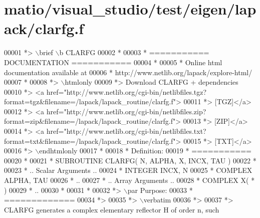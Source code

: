 \hypertarget{matio_2visual__studio_2test_2eigen_2lapack_2clarfg_8f_source}{}\section{matio/visual\+\_\+studio/test/eigen/lapack/clarfg.f}
\label{matio_2visual__studio_2test_2eigen_2lapack_2clarfg_8f_source}

\begin{DoxyCode}
00001 \textcolor{comment}{*> \(\backslash\)brief \(\backslash\)b CLARFG}
00002 \textcolor{comment}{*}
00003 \textcolor{comment}{*  =========== DOCUMENTATION ===========}
00004 \textcolor{comment}{*}
00005 \textcolor{comment}{* Online html documentation available at }
00006 \textcolor{comment}{*            http://www.netlib.org/lapack/explore-html/ }
00007 \textcolor{comment}{*}
00008 \textcolor{comment}{*> \(\backslash\)htmlonly}
00009 \textcolor{comment}{*> Download CLARFG + dependencies }
00010 \textcolor{comment}{*> <a
       href="http://www.netlib.org/cgi-bin/netlibfiles.tgz?format=tgz&filename=/lapack/lapack\_routine/clarfg.f"> }
00011 \textcolor{comment}{*> [TGZ]</a> }
00012 \textcolor{comment}{*> <a
       href="http://www.netlib.org/cgi-bin/netlibfiles.zip?format=zip&filename=/lapack/lapack\_routine/clarfg.f"> }
00013 \textcolor{comment}{*> [ZIP]</a> }
00014 \textcolor{comment}{*> <a
       href="http://www.netlib.org/cgi-bin/netlibfiles.txt?format=txt&filename=/lapack/lapack\_routine/clarfg.f"> }
00015 \textcolor{comment}{*> [TXT]</a>}
00016 \textcolor{comment}{*> \(\backslash\)endhtmlonly }
00017 \textcolor{comment}{*}
00018 \textcolor{comment}{*  Definition:}
00019 \textcolor{comment}{*  ===========}
00020 \textcolor{comment}{*}
00021 \textcolor{comment}{*       SUBROUTINE CLARFG( N, ALPHA, X, INCX, TAU )}
00022 \textcolor{comment}{* }
00023 \textcolor{comment}{*       .. Scalar Arguments ..}
00024 \textcolor{comment}{*       INTEGER            INCX, N}
00025 \textcolor{comment}{*       COMPLEX            ALPHA, TAU}
00026 \textcolor{comment}{*       ..}
00027 \textcolor{comment}{*       .. Array Arguments ..}
00028 \textcolor{comment}{*       COMPLEX            X( * )}
00029 \textcolor{comment}{*       ..}
00030 \textcolor{comment}{*  }
00031 \textcolor{comment}{*}
00032 \textcolor{comment}{*> \(\backslash\)par Purpose:}
00033 \textcolor{comment}{*  =============}
00034 \textcolor{comment}{*>}
00035 \textcolor{comment}{*> \(\backslash\)verbatim}
00036 \textcolor{comment}{*>}
00037 \textcolor{comment}{*> CLARFG generates a complex elementary reflector H of order n, such}

\end{DoxyCode}
